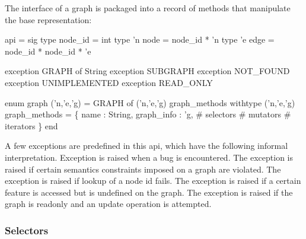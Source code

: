 The interface of a graph is packaged into a 
record of methods that manipulate the base representation:  
\begin{SML}
 api  = sig
   type node_id = int
   type 'n node = node_id * 'n 
   type 'e edge = node_id * node_id * 'e

   exception GRAPH of String
   exception SUBGRAPH        
   exception NOT_FOUND        
   exception UNIMPLEMENTED        
   exception READ_ONLY        

   enum graph ('n,'e,'g) = GRAPH of ('n,'e,'g) graph_methods
   withtype ('n,'e,'g) graph_methods = 
       \{  name            : String,
          graph_info      : 'g,
          #  selectors 
          #  mutators 
          #  iterators 
       \}
 end
\end{SML}

A few exceptions are predefined in this api, which have
the following informal interpretation.
Exception  is raised when a bug is encountered.
The exception  is raised if certain semantics constraints
imposed on a graph are violated.
The exception  is raised if lookup of a node id fails.
The exception  is raised if a certain feature
is accessed but is undefined on the graph.  The exception 
 is raised if the graph is readonly and an update operation
is attempted.

\subsubsection{Selectors}

